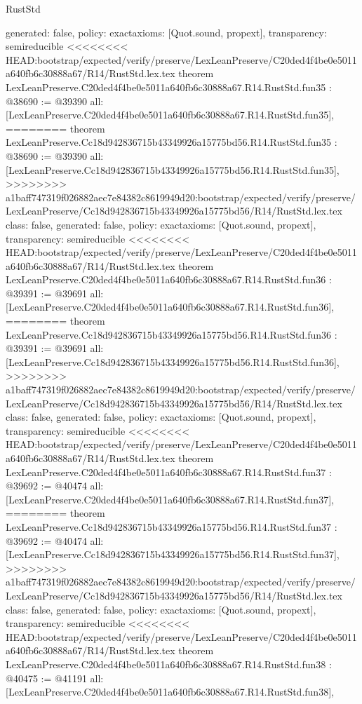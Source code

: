 \begin{lexlean}{RustStd}
\begin{coremodule}
{\begin{coremodule}
{{{{{{{{{{{{{{{{{{{{{{{{{{{{{{{{{{{{{{  generated: false,
  policy: exact{axioms: [Quot.sound, propext]},
  transparency: semireducible
}
<<<<<<<< HEAD:bootstrap/expected/verify/preserve/LexLeanPreserve/C20ded4f4be0e5011a640fb6c30888a67/R14/RustStd.lex.tex
theorem LexLeanPreserve.C20ded4f4be0e5011a640fb6c30888a67.R14.RustStd.fun35 : @38690 := @39390 {
  all: [LexLeanPreserve.C20ded4f4be0e5011a640fb6c30888a67.R14.RustStd.fun35],
========
theorem LexLeanPreserve.Cc18d942836715b43349926a15775bd56.R14.RustStd.fun35 : @38690 := @39390 {
  all: [LexLeanPreserve.Cc18d942836715b43349926a15775bd56.R14.RustStd.fun35],
>>>>>>>> a1baff747319f026882aec7e84382c8619949d20:bootstrap/expected/verify/preserve/LexLeanPreserve/Cc18d942836715b43349926a15775bd56/R14/RustStd.lex.tex
  class: false,
  generated: false,
  policy: exact{axioms: [Quot.sound, propext]},
  transparency: semireducible
}
<<<<<<<< HEAD:bootstrap/expected/verify/preserve/LexLeanPreserve/C20ded4f4be0e5011a640fb6c30888a67/R14/RustStd.lex.tex
theorem LexLeanPreserve.C20ded4f4be0e5011a640fb6c30888a67.R14.RustStd.fun36 : @39391 := @39691 {
  all: [LexLeanPreserve.C20ded4f4be0e5011a640fb6c30888a67.R14.RustStd.fun36],
========
theorem LexLeanPreserve.Cc18d942836715b43349926a15775bd56.R14.RustStd.fun36 : @39391 := @39691 {
  all: [LexLeanPreserve.Cc18d942836715b43349926a15775bd56.R14.RustStd.fun36],
>>>>>>>> a1baff747319f026882aec7e84382c8619949d20:bootstrap/expected/verify/preserve/LexLeanPreserve/Cc18d942836715b43349926a15775bd56/R14/RustStd.lex.tex
  class: false,
  generated: false,
  policy: exact{axioms: [Quot.sound, propext]},
  transparency: semireducible
}
<<<<<<<< HEAD:bootstrap/expected/verify/preserve/LexLeanPreserve/C20ded4f4be0e5011a640fb6c30888a67/R14/RustStd.lex.tex
theorem LexLeanPreserve.C20ded4f4be0e5011a640fb6c30888a67.R14.RustStd.fun37 : @39692 := @40474 {
  all: [LexLeanPreserve.C20ded4f4be0e5011a640fb6c30888a67.R14.RustStd.fun37],
========
theorem LexLeanPreserve.Cc18d942836715b43349926a15775bd56.R14.RustStd.fun37 : @39692 := @40474 {
  all: [LexLeanPreserve.Cc18d942836715b43349926a15775bd56.R14.RustStd.fun37],
>>>>>>>> a1baff747319f026882aec7e84382c8619949d20:bootstrap/expected/verify/preserve/LexLeanPreserve/Cc18d942836715b43349926a15775bd56/R14/RustStd.lex.tex
  class: false,
  generated: false,
  policy: exact{axioms: [Quot.sound, propext]},
  transparency: semireducible
}
<<<<<<<< HEAD:bootstrap/expected/verify/preserve/LexLeanPreserve/C20ded4f4be0e5011a640fb6c30888a67/R14/RustStd.lex.tex
theorem LexLeanPreserve.C20ded4f4be0e5011a640fb6c30888a67.R14.RustStd.fun38 : @40475 := @41191 {
  all: [LexLeanPreserve.C20ded4f4be0e5011a640fb6c30888a67.R14.RustStd.fun38],
}}}}}}}}}}}}}}}}}}}}}}}}}}}}}}}}}}}}}}}}}
\end{coremodule}}
\end{coremodule}
\end{lexlean}
